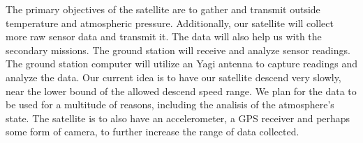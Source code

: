 \documentclass[class=report, crop=false]{standalone}
\begin{document}
The primary objectives of the satellite are to gather and transmit outside temperature and atmospheric pressure.
Additionally, our satellite will collect more raw sensor data and transmit it. The data will also help us with the secondary missions.
The ground station will receive and analyze sensor readings. The ground station computer will utilize an Yagi antenna to capture readings and analyze the data.
Our current idea is to have our satellite descend very slowly, near the lower bound of the allowed descend speed range.
We plan for the data to be used for a multitude of reasons, including the analisis of the atmosphere's state.
The satellite is to also have an accelerometer, a GPS receiver and perhaps some form of camera, to further increase the range of data collected.
\end{document}
